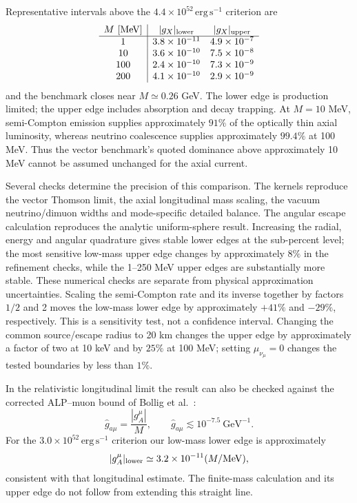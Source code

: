 \documentclass[12pt,a4paper]{article}
\begin{document}
Representative intervals above the \(4.4\times10^{52}\,\mathrm{erg\,s^{-1}}\) criterion are
\[
\begin{array}{c|cc}
M~[\mathrm{MeV}] & |g_X|_{\rm lower} & |g_X|_{\rm upper}\\ \hline
1&3.8\times10^{-11}&4.9\times10^{-7}\\
10&3.6\times10^{-10}&7.5\times10^{-8}\\
100&2.4\times10^{-10}&7.3\times10^{-9}\\
200&4.1\times10^{-10}&2.9\times10^{-9}
\end{array}
\]
and the benchmark closes near \(M\simeq0.26\) GeV. The lower edge is production limited; the upper edge includes absorption and decay trapping. At \(M=10\) MeV, semi-Compton emission supplies approximately \(91\%\) of the optically thin axial luminosity, whereas neutrino coalescence supplies approximately \(99.4\%\) at 100 MeV. Thus the vector benchmark's quoted dominance above approximately 10 MeV cannot be assumed unchanged for the axial current.

Several checks determine the precision of this comparison. The kernels reproduce the vector Thomson limit, the axial longitudinal mass scaling, the vacuum neutrino/dimuon widths and mode-specific detailed balance. The angular escape calculation reproduces the analytic uniform-sphere result. Increasing the radial, energy and angular quadrature gives stable lower edges at the sub-percent level; the most sensitive low-mass upper edge changes by approximately \(8\%\) in the refinement checks, while the 1--250 MeV upper edges are substantially more stable. These numerical checks are separate from physical approximation uncertainties. Scaling the semi-Compton rate and its inverse together by factors \(1/2\) and 2 moves the low-mass lower edge by approximately \(+\!41\%\) and \(-\!29\%\), respectively. This is a sensitivity test, not a confidence interval. Changing the common source/escape radius to 20 km changes the upper edge by approximately a factor of two at 10 keV and by \(25\%\) at 100 MeV; setting \(\mu_{\nu_\mu}=0\) changes the tested boundaries by less than \(1\%\).

In the relativistic longitudinal limit the result can also be checked against the corrected ALP--muon bound of Bollig et al.~\cite{Bollig:2020muon,Bollig:2021erratum}:
\[
\widehat g_{a\mu}=\frac{|g_A^\mu|}{M},\qquad
\widehat g_{a\mu}\lesssim10^{-7.5}~\mathrm{GeV}^{-1}.
\]
For the \(3.0\times10^{52}\,\mathrm{erg\,s^{-1}}\) criterion our low-mass lower edge is approximately
\[
|g_A^\mu|_{\rm lower}\simeq
3.2\times10^{-11}(M/\mathrm{MeV}),
\]
consistent with that longitudinal estimate. The finite-mass calculation and its upper edge do not follow from extending this straight line.
\end{document}
